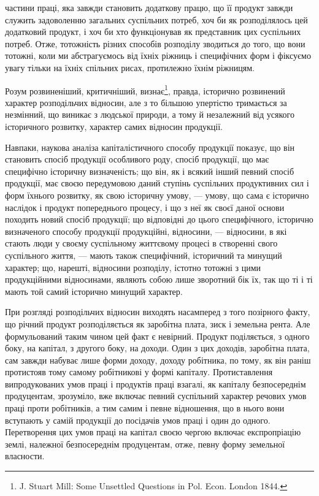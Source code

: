 частини праці, яка завжди становить додаткову працю, що її продукт завжди
служить задоволенню загальних суспільних потреб, хоч би як розподілялось
цей додатковий продукт, і хоч би хто функціонував як представник цих суспільних
потреб. Отже, тотожність різних способів розподілу зводиться до того,
що вони тотожні, коли ми абстрагуємось від їхніх ріжниць і специфічних форм
і фіксуємо увагу тільки на їхніх спільних рисах, протилежно їхнім ріжницям.

Розум розвиненіший, критичніший, визнає\footnote{
J. Stuart Mill: Some Unsettled Questions in Pol. Econ. London 1844.
}, правда, історично розвинений
характер розподільчих відносин, але з то більшою упертістю тримається за незмінний,
що виникає з людської природи, а тому й незалежний від усякого історичного
розвитку, характер самих відносин продукції.

Навпаки, наукова аналіза капіталістичного способу продукції показує, що
він становить спосіб продукції особливого роду, спосіб продукції, що має специфічно
історичну визначеність; що він, як і всякий інший певний спосіб продукції,
має своєю передумовою даний ступінь суспільних продуктивних сил і
форм їхнього розвитку, як свою історичну умову, — умову, що сама є історично
наслідок і продукт попереднього процесу, і що з неї як своєї даної основи
походить новий спосіб продукції; що відповідні до цього специфічного, історично
визначеного способу продукції продукційні, відносини, — відносини, в які стають
люди у своєму суспільному життєвому процесі в створенні свого суспільного
життя, — мають також специфічний, історичний та минущий характер; що, нарешті,
відносини розподілу, істотно тотожні з цими продукційними відносинами,
являють собою лише зворотний бік їх, так що ті і ті мають той самий
історично минущий характер.

При розгляді розподільчих відносин виходять насамперед з того позірного
факту, що річний продукт розподіляється як заробітна плата, зиск і земельна
рента. Але формульований таким чином цей факт є невірний. Продукт поділяється,
з одного боку, на капітал, з другого боку, на доходи. Один з цих доходів,
заробітна плата, сам завжди набуває лише форми доходу, доходу робітника, по
тому, як він раніш протистояв тому самому робітникові у формі капіталу.
Протиставлення випродукованих умов праці і продуктів праці взагалі, як капіталу
безпосереднім продуцентам, зрозуміло, вже включає певний суспільний характер
речових умов праці проти робітників, а тим самим і певне відношення, що
в нього вони вступають у самій продукції до посідачів умов праці і один
до одного. Перетворення цих умов праці на капітал своєю чергою включає
експропріацію землі, належної безпосереднім продуцентам, отже, певну форму
земельної власности.

